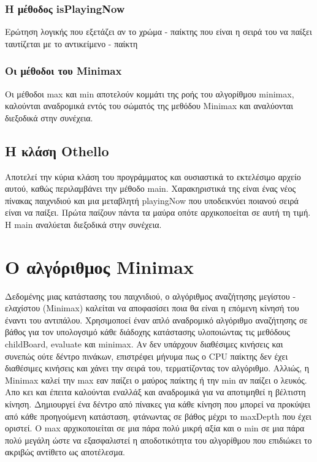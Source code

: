 \documentclass[12pt]{article}
\begin{document}
        \subsubsection{Η μέθοδος isPlayingNow}
        Ερώτηση λογικής που εξετάζει αν το χρώμα - παίκτης που είναι η σειρά του να παίξει ταυτίζεται με το αντικείμενο - παίκτη
        \subsubsection{Οι μέθοδοι του Minimax}
        Οι μέθοδοι max και min αποτελούν κομμάτι της ροής του αλγορίθμου minimax, καλούνται αναδρομικά εντός του σώματός της μεθόδου Minimax και αναλύονται διεξοδικά στην συνέχεια.
    \subsection{Η κλάση Othello}
    Αποτελεί την κύρια κλάση του προγράμματος και ουσιαστικά το εκτελέσιμο αρχείο αυτού, καθώς περιλαμβάνει την μέθοδο main. Χαρακηριστικά της είναι ένας νέος πίνακας παιχνιδιού και μια μεταβλητή playingNow που υποδεικνύει ποιανού σειρά είναι να παίξει. Πρώτα παίζουν πάντα τα μαύρα οπότε αρχικοποείται σε αυτή τη τιμή. Η main αναλύεται διεξοδικά στην συνέχεια. 
\section{Ο αλγόριθμος Minimax}

Δεδομένης μιας κατάστασης του παιχνιδιού, ο αλγόριθμος αναζήτησης μεγίστου - ελαχίστου (Minimax) καλείται να αποφασίσει ποια θα είναι η επόμενη κίνησή του έναντι του αντιπάλου. Χρησιμοποεί έναν απλό αναδρομικό αλγόριθμο αναζήτησης σε βάθος για τον υπολογσιμό κάθε διάδοχης κατάστασης υλοποιώντας τις μεθόδους childBoard, evaluate και minimax. Αν δεν υπάρχουν διαθέσιμες κινήσεις και συνεπώς ούτε δέντρο πινάκων, επιστρέφει μήνυμα πως ο CPU παίκτης δεν έχει διαθέσιμες κινήσεις και χάνει την σειρά του, τερματίζοντας τον αλγόριθμο. Αλλιώς, η Minimax καλεί την max εαν παίζει ο μαύρος παίκτης ή την min αν παίζει ο λευκός. Απο κει και έπειτα καλούνται εναλλάξ και αναδρομικά για να αποτιμηθεί η βέλτιστη κίνηση. Δημιουργεί ένα δέντρο από πίνακες για κάθε κίνηση που μπορεί να προκύψει από κάθε προηγούμενη κατάσταση, φτάνωντας σε βάθος μέχρι το maxDepth που έχει οριστεί. Ο max αρχικοποιείται σε μια πάρα πολύ μικρή αξία και ο min σε μια πάρα πολύ μεγάλη ώστε να εξασφαλιστεί η αποδοτικότητα του αλγορίθμου που επιδιώκει το ακριβώς αντίθετο ως αποτέλεσμα. 
\end{document}

